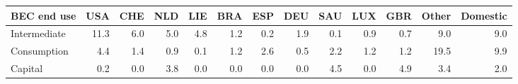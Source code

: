 \begin{tabular}{lrrrrrrrrrrrr}
\toprule
BEC end use & USA & CHE & NLD & LIE & BRA & ESP & DEU & SAU & LUX & GBR & Other & Domestic \\
\midrule
Intermediate & 11.3 & 6.0 & 5.0 & 4.8 & 1.2 & 0.2 & 1.9 & 0.1 & 0.9 & 0.7 & 9.0 & 9.0 \\
Consumption & 4.4 & 1.4 & 0.9 & 0.1 & 1.2 & 2.6 & 0.5 & 2.2 & 1.2 & 1.2 & 19.5 & 9.9 \\
Capital & 0.2 & 0.0 & 3.8 & 0.0 & 0.0 & 0.0 & 0.0 & 4.5 & 0.0 & 4.9 & 3.4 & 2.0 \\
\bottomrule
\end{tabular}
